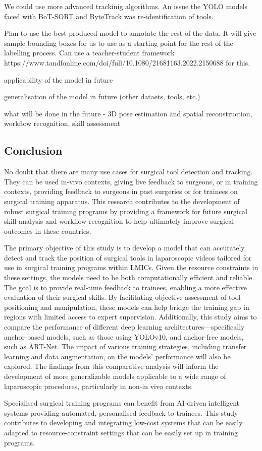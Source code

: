 We could use more advanced trackinig algorithms. An issue the YOLO models faced with BoT-SORT and ByteTrack was re-identification of tools.

Plan to use the best produced model to annotate the rest of the data. It will give sample bounding boxes for us to use as a starting point for the rest of the labelling process. Can use a teacher-student framework https://www.tandfonline.com/doi/full/10.1080/21681163.2022.2150688 for this.

applicability of the model in future

generalisation of the model in future (other dataets, tools, etc.)

what will be done in the future - 3D pose estimation and spatial reconstruction, workflow recognition, skill assessment

\subsection{Conclusion}

No doubt that there are many use cases for surgical tool detection and tracking. They can be used in-vivo contexts, giving live feedback to surgeons, or in training contexts, providing feedback to surgeons in past surgeries or for trainees on surgical training apparatus.
This research contributes to the development of robust surgical training programs by providing a framework for future surgical skill analysis and workflow recognition to help ultimately improve surgical outcomes in these countries.

The primary objective of this study is to develop a model that can accurately detect and track the position of surgical tools in laparoscopic videos tailored for use in surgical training programs within LMICs. Given the resource constraints in these settings, the models need to be both computationally efficient and reliable. The goal is to provide real-time feedback to trainees, enabling a more effective evaluation of their surgical skills. By facilitating objective assessment of tool positioning and manipulation, these models can help bridge the training gap in regions with limited access to expert supervision. Additionally, this study aims to compare the performance of different deep learning architectures—specifically anchor-based models, such as those using YOLOv10, and anchor-free models, such as ART-Net. The impact of various training strategies, including transfer learning and data augmentation, on the models' performance will also be explored. The findings from this comparative analysis will inform the development of more generalizable models applicable to a wide range of laparoscopic procedures, particularly in non-in vivo contexts.

Specialised surgical training programs can benefit from AI-driven intelligent systems providing automated, personalised feedback to trainees. This study contributes to developing and integrating low-cost systems that can be easily adapted to resource-constraint settings that can be easily set up in training programs. 
